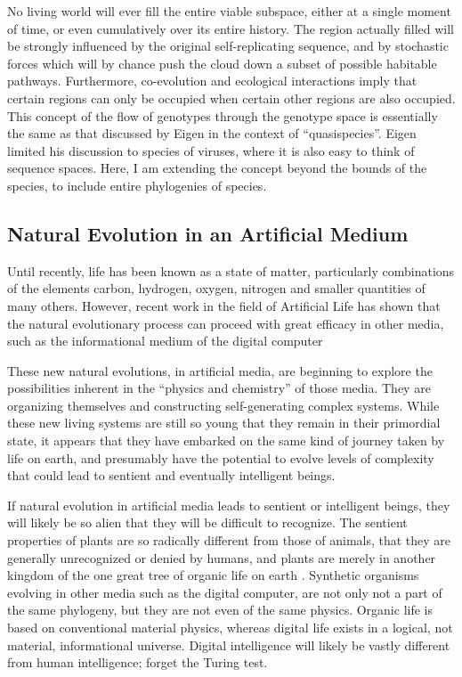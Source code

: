 No living world will ever fill the entire viable subspace, either at a
single moment of time, or even cumulatively over its entire history.  The
region actually filled will be strongly influenced by the original
self-replicating sequence, and by stochastic forces which will by chance
push the cloud down a subset of possible habitable pathways.  Furthermore,
co-evolution and ecological interactions imply that certain regions can
only be occupied when certain other regions are also occupied.  This
concept of the flow of genotypes through the genotype space is essentially
the same as that discussed by Eigen \cite{Eige} in the context of
``quasispecies''.  Eigen limited his discussion to species of viruses,
where it is also easy to think of sequence spaces.  Here, I am extending
the concept beyond the bounds of the species, to include entire phylogenies
of species.

\subsection{Natural Evolution in an Artificial Medium}

Until recently, life has been known as a state of matter, particularly
combinations of the elements carbon, hydrogen, oxygen, nitrogen and
smaller quantities of many others.  However, recent work in the field
of Artificial Life has shown that the natural evolutionary process can
proceed with great efficacy in other media, such as the informational
medium of the digital computer \cite{Adam,BaDa,Broo,Davi1,Davi2,DeGr,Fefe,Gray,Kamp1,Kamp2,Lith,Male,Mano,Rasm90,Rasm91,Ray91a,Ray91b,Ray91c,Ray91d,RayIp,RaySu,Skip,Surk,Tack}

These new natural evolutions, in artificial media, are beginning
to explore the possibilities inherent in the ``physics and chemistry''
of those media.  They are organizing themselves and constructing
self-generating complex systems.  While these new living systems are
still so young that they remain in their primordial state, it appears
that they have embarked on the same kind of journey taken by life on earth,
and presumably have the potential to evolve levels of complexity that
could lead to sentient and eventually intelligent beings.

If natural evolution in artificial media leads to sentient or intelligent
beings, they will likely be so alien that they will be difficult
to recognize.  The sentient properties of plants are so radically
different from those of animals, that they are generally unrecognized
or denied by humans, and plants are merely in another kingdom of the
one great tree of organic life on earth \cite{Ray79,Ray92,StRa}.
Synthetic organisms evolving in other media such as the digital
computer, are not only not a part of the same phylogeny, but they are
not even of the same physics.  Organic life is based on conventional
material physics, whereas digital life exists in a logical, not
material, informational universe.  Digital intelligence will likely
be vastly different from human intelligence; forget the Turing test.

